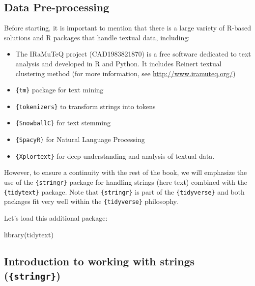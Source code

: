 \documentclass[
]{krantz}
\makeatletter
\newenvironment{Shaded}{\begin{snugshade}}{\end{snugshade}}
\newcommand{\FunctionTok}[1]{\textcolor[rgb]{0,0,0}{#1}}
\newcommand{\NormalTok}[1]{#1}
\providecommand{\tightlist}{%
  \setlength{\itemsep}{0pt}\setlength{\parskip}{0pt}}
\newenvironment{kframe}{%
\medskip{}
\setlength{\fboxsep}{.8em}
 \def\at@end@of@kframe{}%
 \ifinner\ifhmode%
  \def\at@end@of@kframe{\end{minipage}}%
  \begin{minipage}{\columnwidth}%
 \fi\fi%
 \def\FrameCommand##1{\hskip\@totalleftmargin \hskip-\fboxsep
 \colorbox{shadecolor}{##1}\hskip-\fboxsep
     \hskip-\linewidth \hskip-\@totalleftmargin \hskip\columnwidth}%
 \MakeFramed {\advance\hsize-\width
   \@totalleftmargin\z@ \linewidth\hsize
   \@setminipage}}%
 {\par\unskip\endMakeFramed%
 \at@end@of@kframe}
\renewenvironment{Shaded}{\begin{kframe}}{\end{kframe}}
\makeatother
\begin{document}
\hypertarget{data-pre-processing}{%
\subsection{Data Pre-processing}\label{data-pre-processing}}

Before starting, it is important to mention that there is a large variety of R-based solutions and R packages that handle textual data, including:

\begin{itemize}
\tightlist
\item
  The IRaMuTeQ project (CAD1983821870) is a free software dedicated to text analysis and developed in R and Python. It includes Reinert textual clustering method (for more information, see \url{http://www.iramuteq.org/})
\item
  \texttt{\{tm\}} package for text mining
\item
  \texttt{\{tokenizers\}} to transform strings into tokens
\item
  \texttt{\{SnowballC\}} for text stemming
\item
  \texttt{\{SpacyR\}} for Natural Language Processing
\item
  \texttt{\{Xplortext\}} for deep understanding and analysis of textual data.
\end{itemize}

However, to ensure a continuity with the rest of the book, we will emphasize the use of the \texttt{\{stringr\}} package for handling strings (here text) combined with the \texttt{\{tidytext\}} package. Note that \texttt{\{stringr\}} is part of the \texttt{\{tidyverse\}} and both packages fit very well within the \texttt{\{tidyverse\}} philosophy.

Let's load this additional package:

\begin{Shaded}
\begin{Highlighting}[]
\FunctionTok{library}\NormalTok{(tidytext)}
\end{Highlighting}
\end{Shaded}

\hypertarget{introduction-to-working-with-strings-stringr}{%
\subsection{\texorpdfstring{Introduction to working with strings (\texttt{\{stringr\}})}{Introduction to working with strings (\{stringr\})}}\label{introduction-to-working-with-strings-stringr}}
\end{document}
